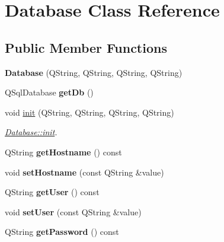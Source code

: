 \hypertarget{class_database}{\section{Database Class Reference}
\label{class_database}
}
\subsection*{Public Member Functions}
\begin{DoxyCompactItemize}
\item 
\hypertarget{class_database_a5d8bbb846ab518f7f3972124cbb1d867}{{\bfseries Database} (Q\+String, Q\+String, Q\+String, Q\+String)}\label{class_database_a5d8bbb846ab518f7f3972124cbb1d867}

\item 
\hypertarget{class_database_a2925e696474bdfc43a46f7142e2975ea}{Q\+Sql\+Database {\bfseries get\+Db} ()}\label{class_database_a2925e696474bdfc43a46f7142e2975ea}

\item 
void \hyperlink{class_database_ac314f58ea7be59d587d60f3ece8892f9}{init} (Q\+String, Q\+String, Q\+String, Q\+String)
\begin{DoxyCompactList}\small\item\em \hyperlink{class_database_ac314f58ea7be59d587d60f3ece8892f9}{Database\+::init}. \end{DoxyCompactList}\item 
\hypertarget{class_database_a91a1c183ac9952a171aba2229e711ebd}{Q\+String {\bfseries get\+Hostname} () const }\label{class_database_a91a1c183ac9952a171aba2229e711ebd}

\item 
\hypertarget{class_database_ae1108262c8940e898d85d132f79c4441}{void {\bfseries set\+Hostname} (const Q\+String \&value)}\label{class_database_ae1108262c8940e898d85d132f79c4441}

\item 
\hypertarget{class_database_a06ad7206bbd4bd4d5bae07d45f741e29}{Q\+String {\bfseries get\+User} () const }\label{class_database_a06ad7206bbd4bd4d5bae07d45f741e29}

\item 
\hypertarget{class_database_a8208ef97013e8c36323374f05214e3ed}{void {\bfseries set\+User} (const Q\+String \&value)}\label{class_database_a8208ef97013e8c36323374f05214e3ed}

\item 
\hypertarget{class_database_ac3c422af93ce292c2500ee55ded5a8ff}{Q\+String {\bfseries get\+Password} () const }\label{class_database_ac3c422af93ce292c2500ee55ded5a8ff}


\end{DoxyCompactItemize}
